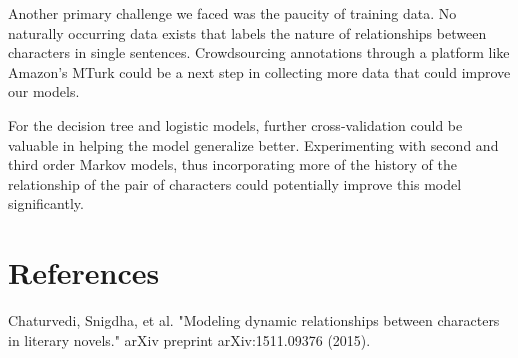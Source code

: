 \documentclass[11pt,a4paper]{article}
\begin{document}
Another primary challenge we faced was the paucity of training data. No naturally occurring data exists that labels the nature of relationships between characters in single sentences. Crowdsourcing annotations through a platform like Amazon’s MTurk could be a next step in collecting more data that could improve our models. 

For the decision tree and logistic models, further cross-validation could be valuable in helping the model generalize better. Experimenting with second and third order Markov models, thus incorporating more of the history of the relationship of the pair of characters could potentially improve this model significantly. 

\section{References}
Chaturvedi, Snigdha, et al. "Modeling dynamic relationships between characters in literary novels." arXiv preprint arXiv:1511.09376 (2015).



%
%
%
%
\end{document}
